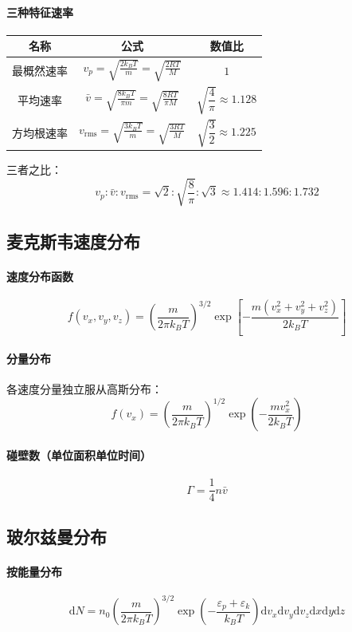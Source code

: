 \documentclass[UTF8]{ctexart}
\begin{document}
\paragraph{三种特征速率}
\begin{center}
\begin{tabular}{c|c|c}
\hline
名称 & 公式 & 数值比 \\
\hline
最概然速率 & $\displaystyle v_p=\sqrt{\frac{2k_B T}{m}}=\sqrt{\frac{2RT}{M}}$ & $1$ \\
平均速率 & $\displaystyle \bar{v}=\sqrt{\frac{8k_B T}{\pi m}}=\sqrt{\frac{8RT}{\pi M}}$ & $\sqrt{\dfrac{4}{\pi}}\approx 1.128$ \\
方均根速率 & $\displaystyle v_{\mathrm{rms}}=\sqrt{\frac{3k_B T}{m}}=\sqrt{\frac{3RT}{M}}$ & $\sqrt{\dfrac{3}{2}}\approx 1.225$ \\
\hline
\end{tabular}
\end{center}

三者之比：
\[
\boxed{v_p:\bar{v}:v_{\mathrm{rms}}=\sqrt{2}:\sqrt{\frac{8}{\pi}}:\sqrt{3}\approx 1.414:1.596:1.732}
\]

\subsection{麦克斯韦速度分布}

\paragraph{速度分布函数}
\[
f(v_x,v_y,v_z)=\left(\frac{m}{2\pi k_B T}\right)^{3/2}
\exp\!\left[-\frac{m(v_x^2+v_y^2+v_z^2)}{2k_B T}\right]
\]

\paragraph{分量分布}
各速度分量独立服从高斯分布：
\[
f(v_x)=\left(\frac{m}{2\pi k_B T}\right)^{1/2}\exp\!\left(-\frac{mv_x^2}{2k_B T}\right)
\]

\paragraph{碰壁数（单位面积单位时间）}
\[
\boxed{\Gamma=\frac{1}{4}n\bar{v}}
\]

\subsection{玻尔兹曼分布}

\paragraph{按能量分布}
\[
\mathrm{d}N=n_0\left(\frac{m}{2\pi k_B T}\right)^{3/2}
\exp\!\left(-\frac{\varepsilon_p+\varepsilon_k}{k_B T}\right)
\mathrm{d}v_x\mathrm{d}v_y\mathrm{d}v_z\mathrm{d}x\mathrm{d}y\mathrm{d}z
\]
\end{document}
